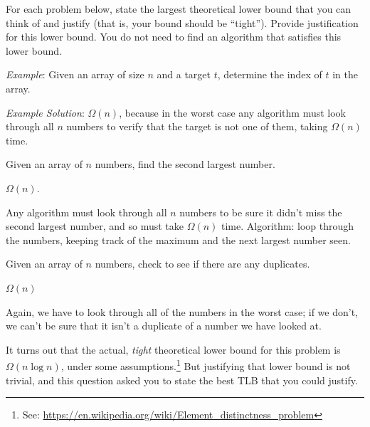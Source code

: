 \begin{prob}
    For each problem below, state the largest theoretical lower bound that you can think
    of and justify (that is, your bound should be ``tight'').
    Provide justification for this lower bound. You do not need to find an algorithm
    that satisfies this lower bound.

    \emph{Example}: Given an array of size $n$ and a target $t$, determine the index of $t$ in the array.

    \emph{Example Solution}: $\Omega(n)$, because in the worst case any
    algorithm must look through all $n$ numbers to verify that the target is
    not one of them, taking $\Omega(n)$ time.

    \begin{subprobset}
        \begin{subprob}
            Given an array of $n$ numbers, find the second largest number.

            \begin{soln}
                $\Omega(n)$.

                Any algorithm must look through all $n$ numbers to be sure it didn't miss
                the second largest number, and so must take
                $\Omega(n)$ time. Algorithm: loop through the numbers, keeping
                track of the maximum and the next largest number seen.
            \end{soln}
        \end{subprob}

        \begin{subprob}
            Given an array of $n$ numbers, check to see if there are any duplicates.

            \begin{soln}
                $\Omega(n)$

                Again, we have to look through all of the numbers in the worst case;
                if we don't, we can't be sure that it isn't a duplicate of a number we
                have looked at.

                It turns out that the actual, \emph{tight} theoretical lower bound for this
                problem is $\Omega(n \log n)$, under some assumptions.\footnote{See:
                \url{https://en.wikipedia.org/wiki/Element_distinctness_problem}}
                But justifying that lower bound is not trivial, and this question asked
                you to state the best TLB that you could justify.


\end{soln}
\end{subprob}
\end{subprobset}
\end{prob}
